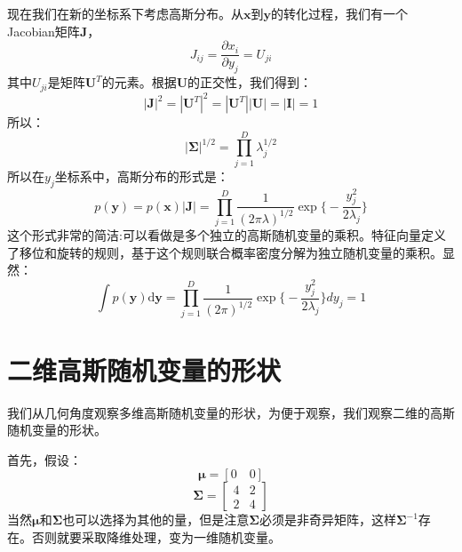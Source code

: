 \documentclass[10pt,a4paper,UTF8]{article}
\begin{document}
现在我们在新的坐标系下考虑高斯分布。从\(\mathbf{x}\)到\(\mathbf{y}\)的转化过程，我们有一个Jacobian矩阵\(\mathbf{J}\)，
\begin{equation}
\label{eq:11}
J_{ij} = \frac{\partial x_{i}}{\partial y_{j}} = U_{ji}
\end{equation}
其中\(U_{ji}\)是矩阵\(\mathbf{U}^{T}\)的元素。根据\(\mathbf{U}\)的正交性，我们得到：
\begin{equation}
\label{eq:12}
| \mathbf{J} |^2 = | \mathbf{U}^T |^2 = | \mathbf{U}^T| |\mathbf{U}| = |\mathbf{I}| = 1
\end{equation}
所以：
\begin{equation}
\label{eq:13}
| \mathbf{\Sigma} |^{1/2} = \prod_{j=1}^D \lambda_j^{1/2}
\end{equation}
所以在\(y_{j}\)坐标系中，高斯分布的形式是：
\begin{equation}
\label{eq:14}
p(\mathbf{y}) = p(\mathbf{x})|\mathbf{J}| = \prod_{j=1}^{D} \frac{1}{(2\pi\lambda)^{1/2}}\exp\bigg\{ - \frac{y_{j}^{2}}{2\lambda_{j}}\bigg\}
\end{equation}
这个形式非常的简洁:可以看做是多个独立的高斯随机变量的乘积。特征向量定义了移位和旋转的规则，基于这个规则联合概率密度分解为独立随机变量的乘积。显然：
\begin{equation}
\label{eq:15}
\int p(\mathbf{y}) \mathrm{d}\mathbf{y} = \prod_{j=1}^{D}\frac{1}{(2\pi)^{1/2}}\exp\bigg\{ -\frac{y_{j}^{2}}{2\lambda_{j}} \bigg\} dy_{j} =1
\end{equation}
\section{二维高斯随机变量的形状}
\label{sec:org0055f55}


我们从几何角度观察多维高斯随机变量的形状，为便于观察，我们观察二维的高斯随机变量的形状。

首先，假设：
\begin{equation}
\label{eq:24}
\mathbf{\mu} = [ 0 \quad 0]
\end{equation}
\begin{equation}
\label{eq:25}
\mathbf{\Sigma} =
\begin{bmatrix}
4 & 2 \\
2 & 4
\end{bmatrix}
\end{equation}
当然\(\mathbf{\mu}\)和\(\mathbf{\Sigma}\)也可以选择为其他的量，但是注意\(\mathbf{\Sigma}\)必须是非奇异矩阵，这样\(\mathbf{\Sigma}^{-1}\)存在。否则就要采取降维处理，变为一维随机变量。
\end{document}
